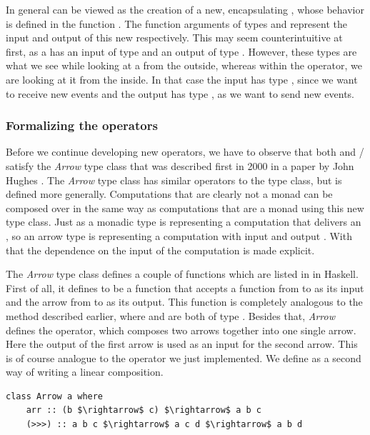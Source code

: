 In general  can be viewed as the creation of a new, encapsulating \comp, whose behavior is defined in the function . The function arguments of types \obs and \obv represent the input and output of this new \comp respectively. This may seem counterintuitive at first, as a \comp has an input of type \obv and an output of type \obs. However, these types are what we see while looking at a \comp from the outside, whereas within the  operator, we are looking at it from the inside. In that case the input has type \obs, since we want to receive new events and the output has type \obv, as we want to send new events.

\subsubsection{Formalizing the operators}
Before we continue developing new operators, we have to observe that both  and / satisfy the \textit{Arrow} type class that was described first in 2000 in a paper by John Hughes \cite{hughes2000-arrows}. The \textit{Arrow}  type class has similar operators to the  type class, but is defined more generally. Computations that are clearly not a monad can be composed over in the same way as computations that are a monad using this new type class. Just as a monadic type  is representing a computation that delivers an , so an arrow type  is representing a computation with input  and output . With that the dependence on the input of the computation is made explicit.

The \textit{Arrow} type class defines a couple of functions which are listed in  in Haskell. First of all, it defines  to be a function that accepts a function from  to  as its input and the arrow from  to  as its output. This function is completely analogous to the  method described earlier, where  and  are both of type \obs. Besides that, \textit{Arrow} defines the \code{(>>>)} operator, which composes two arrows together into one single arrow. Here the output of the first arrow is used as an input for the second arrow. This is of course analogue to the  operator we just implemented. We define \code{(>>>)} as a second way of writing a linear composition.

\begin{minipage}{\linewidth}
\begin{lstlisting}[style=HaskellStyle, caption={\textit{Arrow} type class}, label={lst:arrow-typeclass}]
class Arrow a where
    arr :: (b $\rightarrow$ c) $\rightarrow$ a b c
    (>>>) :: a b c $\rightarrow$ a c d $\rightarrow$ a b d
\end{lstlisting}
\end{minipage}

